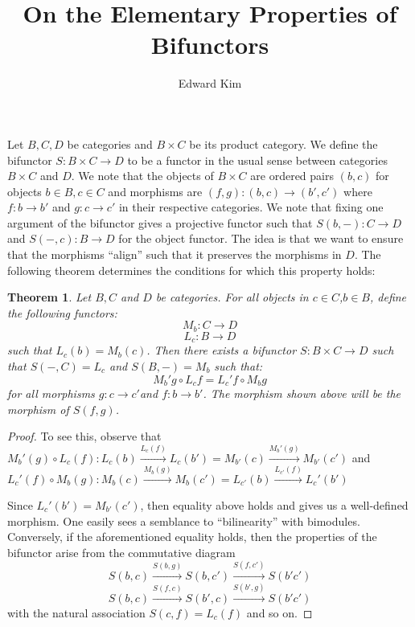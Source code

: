 \documentclass[12pt]{article}
\title{On the Elementary Properties of Bifunctors}
\author{Edward Kim}
\newtheorem{theorem}{Theorem}[section]
\begin{document}
\maketitle
\hrulefill

Let $B,C,D$ be categories and $B \times C$ be its product category. We define the bifunctor $S: B \times C \rightarrow D$ to be a functor in the usual sense between categories $B \times C$ and $D$. We note that the objects of $B \times C$ are ordered pairs $(b,c)$ for objects $b \in B, c \in C$ and morphisms are $(f,g): (b,c) \rightarrow (b',c')$ where $f:b \rightarrow b'$ and $g:c \rightarrow c'$ in their respective categories. We note that fixing one argument of the bifunctor gives a projective functor such that $S(b,-): C \rightarrow D$ and $S(-,c): B 
\rightarrow D$ for the object functor. The idea is that we want to ensure that the morphisms ``align'' such that it preserves the morphisms in $D$. The following theorem determines the conditions for which this property holds:

\begin{theorem}
 Let $B,C$ and $D$ be categories. For all objects in $c \in C$,$b \in B$, define the following functors: 
 $$M_b : C \rightarrow D $$
 $$L_c : B \rightarrow D $$
 such that $L_c(b) = M_b(c)$. Then there exists a bifunctor $S: B \times C \rightarrow D$ such that $S(-,C) = L_c$ and $S(B,-) = M_b$ such that:
 $$ M_b'g \circ L_cf = L_c'f \circ M_bg $$ for all morphisms $g: c \rightarrow c'$and $f:b \rightarrow b'$. The morphism shown above will be the morphism of $S(f,g)$.
\end{theorem}

\begin{proof}
To see this, observe that $M_b'(g) \circ L_c(f): L_c(b) \xrightarrow{L_c(f)} L_c(b') = M_{b'}(c) \xrightarrow{M_b'(g)} M_{b'}(c')$  
and $L_c'(f) \circ M_b(g): M_b(c) \xrightarrow{M_b(g)} M_b(c') = L_{c'}(b) \xrightarrow{L_{c'}(f)} L_c'(b') $ 
 
Since $L_c'(b') = M_{b'}(c')$, then equality above holds and gives us a well-defined morphism. One easily sees a semblance to ``bilinearity'' with bimodules. Conversely, if the aforementioned equality holds, then the properties of the bifunctor arise from the commutative diagram 
 $$S(b,c) \xrightarrow{S(b,g)} S(b,c') \xrightarrow{S(f,c')} S(b'c') $$
 $$S(b,c) \xrightarrow{S(f,c)} S(b',c) \xrightarrow{S(b',g)} S(b'c') $$
 with the natural association $S(c,f) = L_c(f)$ and so on.
\end{proof}
\end{document}
